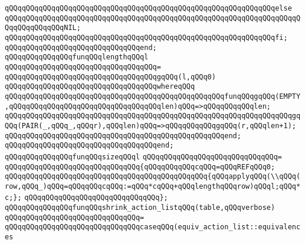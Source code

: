 \verb|qQQqqQQqqQQqqQQqqQQqqQQqqQQqqQQqqQQqqQQqqQQqqQQqqQQqqQQqqQQqqQQqelse|\newline
\verb|qQQqqQQqqQQqqQQqqQQqqQQqqQQqqQQqqQQqqQQqqQQqqQQqqQQqqQQqqQQqqQQqqQQqqQQqqQQqqQQqqQQqNIL;|\newline
\verb|qQQqqQQqqQQqqQQqqQQqqQQqqQQqqQQqqQQqqQQqqQQqqQQqqQQqqQQqqQQqqQQqfi;|\newline
\verb|qQQqqQQqqQQqqQQqqQQqqQQqqQQqqQQqend;|\newline
\newline
\verb|qQQqqQQqqQQqqQQqfunqQQqlengthqQQql|\newline
\verb|qQQqqQQqqQQqqQQqqQQqqQQqqQQqqQQqqQQq=|\newline
\verb|qQQqqQQqqQQqqQQqqQQqqQQqqQQqqQQqqQQqgqQQq(l,qQQq0)|\newline
\verb|qQQqqQQqqQQqqQQqqQQqqQQqqQQqqQQqqQQqwhereqQQq|\newline
\newline
\verb|qQQqqQQqqQQqqQQqqQQqqQQqqQQqqQQqqQQqqQQqqQQqqQQqqQQqfunqQQqgqQQq(EMPTY,qQQqqQQqqQQqqQQqqQQqqQQqqQQqqQQqqQQqlen)qQQq=>qQQqqQQqqQQqlen;|\newline
\verb|qQQqqQQqqQQqqQQqqQQqqQQqqQQqqQQqqQQqqQQqqQQqqQQqqQQqqQQqqQQqqQQqqQQqgqQQq(PAIR(_,qQQq_,qQQqr),qQQqlen)qQQq=>qQQqqQQqqQQqgqQQq(r,qQQqlen+1);|\newline
\verb|qQQqqQQqqQQqqQQqqQQqqQQqqQQqqQQqqQQqqQQqqQQqqQQqqQQqend;|\newline
\verb|qQQqqQQqqQQqqQQqqQQqqQQqqQQqqQQqqQQqend;|\newline
\newline
\verb|qQQqqQQqqQQqqQQqfunqQQqsizeqQQql|\newline
\verb|qQQqqQQqqQQqqQQqqQQqqQQqqQQqqQQq=|\newline
\verb|qQQqqQQqqQQqqQQqqQQqqQQqqQQqqQQq{qQQqqQQqqQQqcqQQq=qQQqREFqQQq0;|\newline
\verb|qQQqqQQqqQQqqQQqqQQqqQQqqQQqqQQqqQQqqQQqqQQqqQQq{qQQqapplyqQQq(\\qQQq(row,qQQq_)qQQq=qQQqqQQqcqQQq:=qQQq*cqQQq+qQQqlengthqQQqrow)qQQql;qQQq*c;};|\newline
\verb|qQQqqQQqqQQqqQQqqQQqqQQqqQQqqQQq};|\newline
\newline
\verb|qQQqqQQqqQQqqQQqfunqQQqshrink_action_listqQQq(table,qQQqverbose)|\newline
\verb|qQQqqQQqqQQqqQQqqQQqqQQqqQQqqQQq=|\newline
\verb|qQQqqQQqqQQqqQQqqQQqqQQqqQQqqQQqcaseqQQq(equiv_action_list::equivalences|\newline
